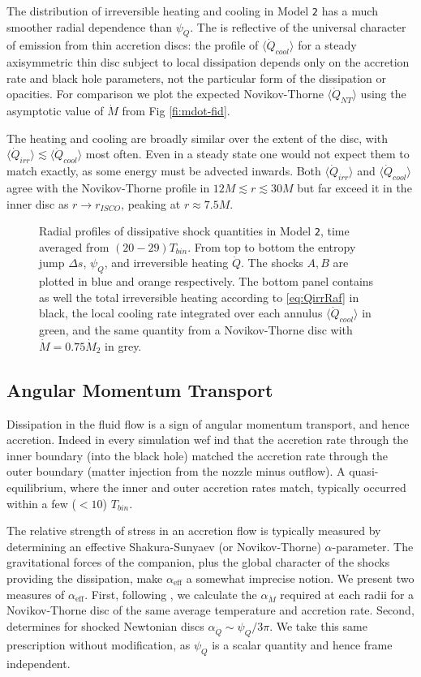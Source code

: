 \documentclass{emulateapj}
\newcommand{\al}{\alpha}
\newcommand{\De}{\Delta}
\newcommand{\model}[1]{{Model \texttt{#1}}}
\newcommand{\avet}[1]{ \langle #1 \rangle}
\begin{document}
The distribution of irreversible heating and cooling in \model{2} has a much smoother radial dependence than $\psi_Q$. The is reflective of the universal character of emission from thin accretion discs: the profile of $\avet{\dot{Q}_{cool}}$ for a steady axisymmetric thin disc subject to local dissipation depends only on the accretion rate and black hole parameters, not the particular form of the dissipation or opacities.  For comparison we plot the expected Novikov-Thorne $\avet{\dot{Q}_{NT}}$ using the asymptotic value of $\dot{M}$ from Fig \ref{fi:mdot-fid}. 

The heating and cooling are broadly similar over the extent of the disc, with $\avet{\dot{Q}_{irr}} \lesssim \avet{\dot{Q}_{cool}}$ most often.  Even in a steady state one would not expect them to match exactly, as some energy must be advected inwards.  Both $\avet{\dot{Q}_{irr}}$ and $\avet{\dot{Q}_{cool}}$ agree with the Novikov-Thorne profile in $12 M \lesssim r \lesssim 30M$ but far exceed it in the inner disc as $r \to r_{ISCO}$, peaking at $r \approx 7.5M$.

\begin{figure}
\caption{\label{fi:diss} Radial profiles of dissipative shock quantities in \model{2}, time averaged from $(20 - 29) T_{bin}$.  From top to bottom the entropy jump $\De s$, $\psi_Q$, and irreversible heating $\dot{Q}$. The shocks $A,B$ are plotted in blue and orange respectively.  The bottom panel contains as well the total irreversible heating according to \eqref{eq:QirrRaf} in black, the local cooling rate integrated over each annulus $\avet{\dot{Q}_{cool}}$ in green, and the same quantity from a Novikov-Thorne disc with $\dot{M} = 0.75 \dot{M}_2$ in grey.}
\end{figure}

\subsection{Angular Momentum Transport}
\label{subsec:angmom}

Dissipation in the fluid flow is a sign of angular momentum transport, and hence accretion. Indeed in every simulation wef ind that the accretion rate through the inner boundary (into the black hole) matched the accretion rate through the outer boundary (matter injection from the nozzle minus outflow).  A quasi-equilibrium, where the inner and outer accretion rates match, typically occurred within a few ($<10$) $T_{bin}$. 

The relative strength of stress in an accretion flow is typically measured by determining an effective Shakura-Sunyaev (or Novikov-Thorne) $\al$-parameter.  The gravitational forces of the companion, plus the global character of the shocks providing the dissipation, make $\al_{\text{eff}}$ a somewhat imprecise notion.  We present two measures of $\al_{\text{eff}}$.  First, following \cite{Ju16}, we calculate the $\al_{\dot{M}}$ required at each radii for a Novikov-Thorne disc of the same average temperature and accretion rate.  Second, \cite{Rafikov16} determines for shocked Newtonian discs $\al_{\dot{Q}} \sim \psi_Q / 3\pi$.  We take this same prescription without modification, as $\psi_Q$ is a scalar quantity and hence frame independent.  
\end{document}
